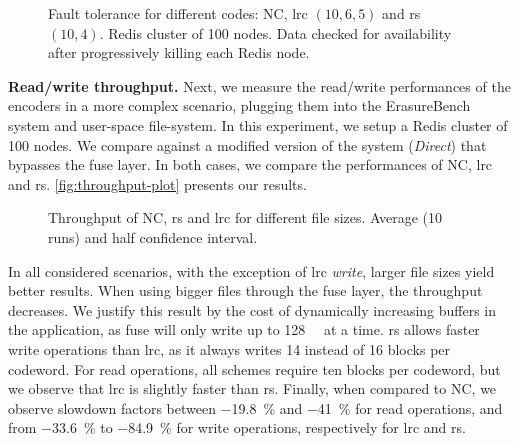 \begin{table}
    \centering
    \caption{Encoding throughput of the different encoders in \si{\mega\byte\per\second}}
    
    \label{table:codes-performance-table}
\end{table}

\begin{figure}[ht]
    \centering
    
    \caption{Fault tolerance for different codes: NC, \ac{lrc} $\left(10,6,5\right)$ and \ac{rs} $\left(10,4\right)$. Redis cluster of 100 nodes. Data checked for availability after progressively killing each Redis node.}
    \label{fig:checksum-plot}
\end{figure}


\textbf{Read/write throughput.}
Next, we measure the read/write performances of the encoders in a more complex scenario, plugging them into the ErasureBench system and user-space file-system.
In this experiment, we setup a Redis cluster of 100 nodes.
We compare against a modified version of the system (\textit{Direct}) that bypasses the \ac{fuse} layer.
In both cases, we compare the performances of NC, \ac{lrc} and \ac{rs}. %
\autoref{fig:throughput-plot} presents our results.
\begin{figure*}[t]
    \centering
    
    \caption{Throughput of NC, \ac{rs} and \ac{lrc} for different file sizes. Average (10 runs) and half confidence interval.}
    \label{fig:throughput-plot}
\end{figure*}
In all considered scenarios, with the exception of \ac{lrc} \textit{write}, larger file sizes yield better results.
When using bigger files through the \ac{fuse} layer, the throughput decreases.
We justify this result by the cost of dynamically increasing buffers in the application, as \ac{fuse} will only write up to \SI{128}{\kibi\byte} at a time.
\ac{rs} allows faster write operations than \ac{lrc}, as it always writes 14 instead of 16 blocks per codeword.
For read operations, all schemes require ten blocks per codeword, but we observe that \ac{lrc} is slightly faster than \ac{rs}.  
Finally, when compared to NC, we observe slowdown factors between \SI{-19.8}{\percent} and \SI{-41}{\percent} for read operations, and from \SI{-33.6}{\percent} to \SI{-84.9}{\percent} for write operations, respectively for \ac{lrc} and \ac{rs}.


